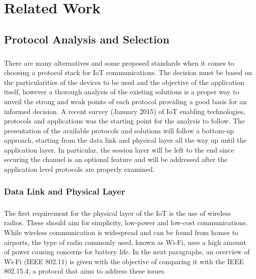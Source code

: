 
\chapter{Related Work}
\label{chapter:related_work}

\section{Protocol Analysis and Selection}
\label{sec:protocol_analysis}

\paragraph{}
There are many alternatives and some proposed standards when it comes to choosing a protocol stack for \gls{IoT} communications. The decision must be based on the particularities of the devices to be used and the objective of the application itself, however a thorough analysis of the existing solutions is a proper way to unveil the strong and weak points of each protocol providing a good basis for an informed decision. A recent survey (January 2015) \cite{Al-Fuqaha2015} of \gls{IoT} enabling technologies, protocols and applications was the starting point for the analysis to follow. The presentation of the available protocols and solutions will follow a bottom-up approach, starting from the data link and physical layer all the way up until the application layer. In particular, the session layer will be left to the end since securing the channel is an optional feature and will be addressed after the application level protocols are properly examined.

\subsection{Data Link and Physical Layer}

\paragraph{}
The first requirement for the physical layer of the \gls{IoT} is the use of wireless radios. These should aim for simplicity, low-power and low-cost communications. While wireless communication is widespread and can be found from homes to airports, the type of radio commonly used, known as Wi-Fi, uses a high amount of power causing concerns for battery life. In the next paragraphs, an overview of Wi-Fi (IEEE 802.11) is given with the objective of comparing it with the IEEE 802.15.4, a protocol that aims to address these issues.

